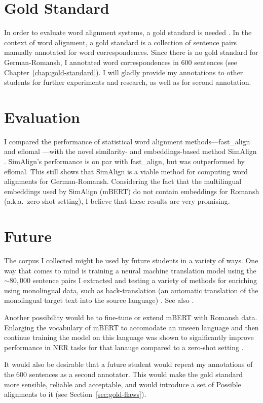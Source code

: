 \section{Gold Standard}
In order to evaluate word alignment systems, a gold standard is needed \autocite[115]{koehn2009}. 
In the context of word alignment, a gold standard is a collection of sentence pairs manually annotated for word correspondences. 
Since there is no gold standard for German-Romansh, I annotated word correspondences in 600 sentences (see Chapter~\ref{chap:gold-standard}). I will  gladly provide my annotations to other students for further experiments and research, as well as for second annotation.  

\section{Evaluation}
I compared the performance of statistical word alignment methods---fast\_align \autocite{dyer-etal-2013-simple} and eflomal \autocite{Ostling2016efmaral}---with the novel similarity- and embeddings-based method SimAlign \autocite{jalili-sabet-etal-2020-simalign}. 
SimAlign's performance is on par with fast\_align, but was outperformed by eflomal. 
This still shows that SimAlign is a viable method for computing word alignments for German-Romansh. 
Considering the fact that the multilingual embeddings used by SimAlign (mBERT) do not contain embeddings for Romansh (a.k.a.~zero-shot setting), I believe that these results are very promising.

\section{Future}
The corpus I collected might be used by future students in a variety of ways. 
One way that comes to mind is training a neural machine translation model using the $\sim80,000$ sentence pairs I extracted and testing a variety of methods for enriching using monolingual data, such as back-translation (an automatic translation of the monolingual target text into the source language) \autocite{sennrich-etal-2016-improving}. 
See also \textcite{https://doi.org/10.48550/arxiv.2107.04239}.

Another possibility would be to fine-tune or extend mBERT with Romansh data. 
Enlarging the vocabulary of mBERT to accomodate an unseen language and then continue training the model on this language was shown to significantly improve performance in  NER tasks for that lanauge compared to a zero-shot setting \autocite{wang-etal-2020-extending}. 

It would also be desirable that a future student would repeat my annotations of the 600 sentences as a second annotator. 
This would make the gold standard more sensible, reliable and acceptable, and would introduce a set of Possible alignments to it (see Section~\ref{sec:gold-flaws}).




